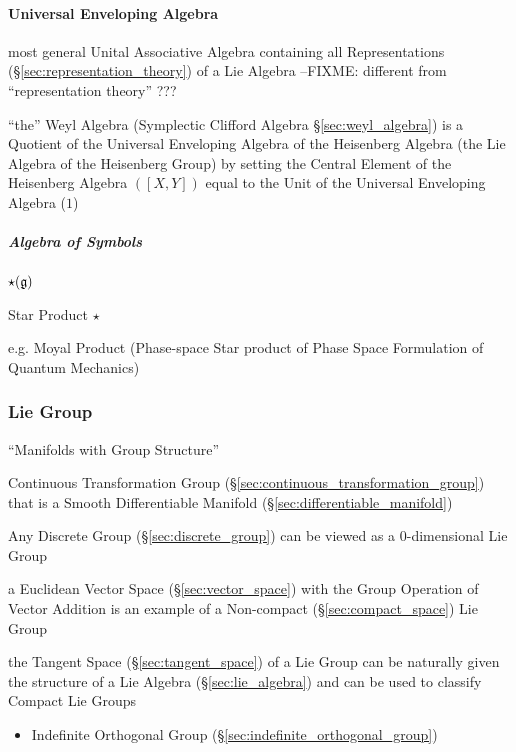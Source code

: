 \paragraph{Universal Enveloping Algebra}
\label{sec:universal_enveloping_algebra}\hfill

most general Unital Associative Algebra containing all Representations
(\S\ref{sec:representation_theory}) of a Lie Algebra
--FIXME: different from ``representation theory'' ???

\fist ``the'' Weyl Algebra (Symplectic Clifford Algebra
\S\ref{sec:weyl_algebra}) is a Quotient of the Universal Enveloping Algebra of
the Heisenberg Algebra (the Lie Algebra of the Heisenberg Group) by setting the
Central Element of the Heisenberg Algebra $([X,Y])$ equal to the Unit of the
Universal Enveloping Algebra ($1$)



\subparagraph{Algebra of Symbols}\label{sec:symbol_algebra}\hfill

$\star(\mathfrak{g})$

Star Product $\star$

e.g. Moyal Product (Phase-space Star product of Phase Space Formulation of
Quantum Mechanics)



\subsubsection{Lie Group}\label{sec:lie_group}

``Manifolds with Group Structure''

Continuous Transformation Group
(\S\ref{sec:continuous_transformation_group}) that is a Smooth
Differentiable Manifold (\S\ref{sec:differentiable_manifold})

Any Discrete Group (\S\ref{sec:discrete_group}) can be viewed as a
$0$-dimensional Lie Group %

a Euclidean Vector Space (\S\ref{sec:vector_space}) with the Group Operation of
Vector Addition is an example of a Non-compact (\S\ref{sec:compact_space}) Lie
Group

the Tangent Space (\S\ref{sec:tangent_space}) of a Lie Group can be naturally
given the structure of a Lie Algebra (\S\ref{sec:lie_algebra}) and can be used
to classify Compact Lie Groups

\begin{itemize}
  \item Indefinite Orthogonal Group (\S\ref{sec:indefinite_orthogonal_group})
\end{itemize}



